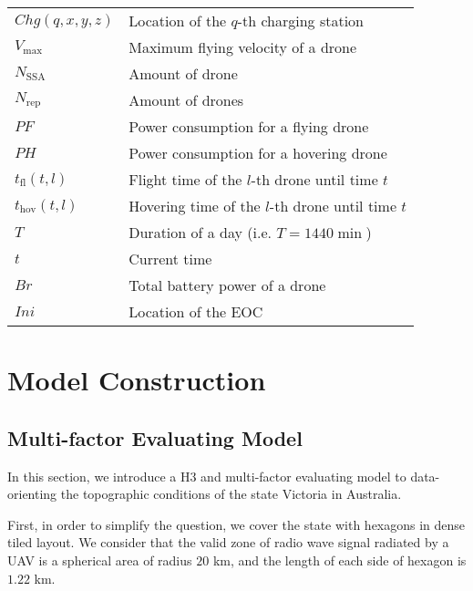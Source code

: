 \documentclass[13pt]{ctexart} %
\begin{document}
\begin{table}[h]
\begin{tabular}{>{\centering\arraybackslash}p{6em}>{\centering\arraybackslash}p{30em}}
        $Chg
        (q,x,y,z)$       & Location of the $q$-th charging station \\
        $V_{\text{max}}$ & Maximum flying velocity of a drone      \\
        $N_{\text{SSA}}$ & Amount of drone
        \uppercase\expandafter{\romannumeral1}                     \\
        $N_{\text{rep}}$ & Amount of drones
        \uppercase\expandafter{\romannumeral2}                     \\
        $PF$             & Power consumption for a flying drone    \\
        $PH$             & Power consumption for a hovering drone  \\
        $t_{\text{fl}}
        (t,l)$           & Flight time of the $l$-th drone
        until time $t$                                             \\
        $t_{\text{hov}}
        (t,l)$           & Hovering time of the $l$-th drone
        until time $t$                                             \\
        $T$              & Duration of a day (i.e. $T=1440 \min$)  \\
        $t$              & Current time                            \\
        $Br$             & Total battery power of a drone          \\
        $Ini$            & Location of the EOC                     \\
        \bottomrule
    \end{tabular}
\end{table}
\section{Model Construction}
\subsection{Multi-factor Evaluating Model}
In this section, we introduce a H3 and multi-factor evaluating model to data-orienting the topographic conditions of the state Victoria in Australia.

First, in order to simplify the question, we cover the state with hexagons in dense tiled layout. We consider that the valid zone of radio wave signal radiated by a UAV is a spherical area of radius $20$ km, and the length of each side of hexagon is $1.22$ km.
\end{document}
